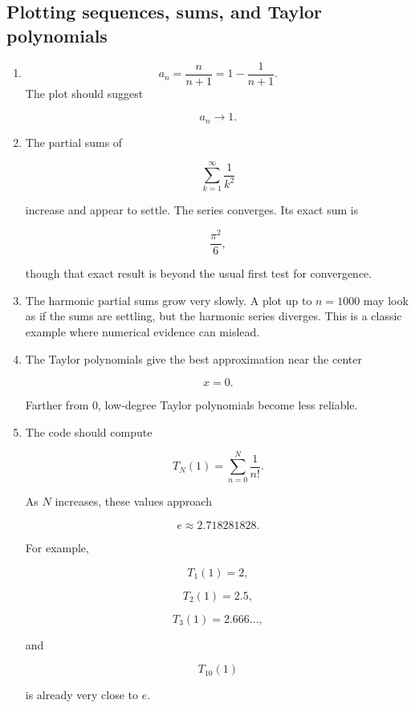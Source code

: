 \subsection*{Plotting sequences, sums, and Taylor polynomials}

\begin{enumerate}
\item
\[
a_n=\frac{n}{n+1}=1-\frac1{n+1}.
\]
The plot should suggest

\[
a_n\to1.
\]

\item
The partial sums of

\[
\sum_{k=1}^{\infty}\frac1{k^2}
\]

increase and appear to settle.  The series converges.  Its exact sum is

\[
\frac{\pi^2}{6},
\]

though that exact result is beyond the usual first test for convergence.

\item
The harmonic partial sums grow very slowly.  A plot up to \(n=1000\) may look as if
the sums are settling, but the harmonic series diverges.  This is a classic example where
numerical evidence can mislead.

\item
The Taylor polynomials give the best approximation near the center

\[
x=0.
\]

Farther from \(0\), low-degree Taylor polynomials become less reliable.

\item
The code should compute

\[
T_N(1)=\sum_{n=0}^{N}\frac1{n!}.
\]

As \(N\) increases, these values approach

\[
e\approx2.718281828.
\]

For example,

\[
T_1(1)=2,
\]

\[
T_2(1)=2.5,
\]

\[
T_3(1)=2.666\ldots,
\]

and

\[
T_{10}(1)
\]

is already very close to \(e\).
\end{enumerate}